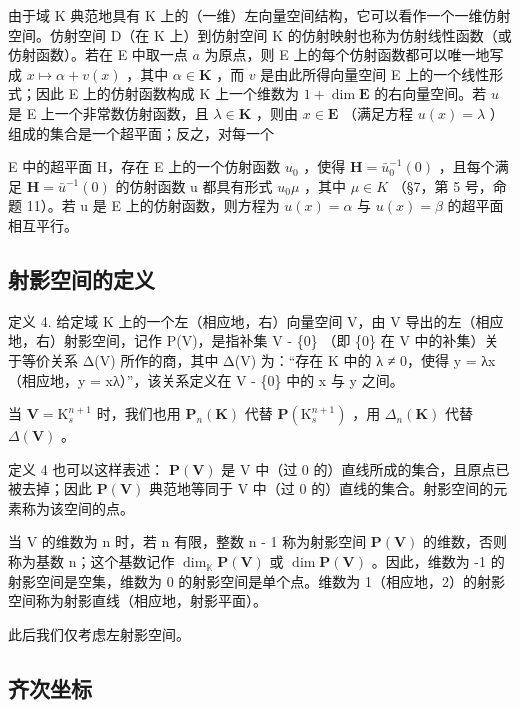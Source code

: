 由于域 K 典范地具有 K 上的（一维）左向量空间结构，它可以看作一个一维仿射空间。仿射空间 D（在 K 上）到仿射空间 K 的仿射映射也称为仿射线性函数（或仿射函数）。若在 E 中取一点 \(a\) 为原点，则 E 上的每个仿射函数都可以唯一地写成 \(x \mapsto \alpha + v(x)\) ，其中 \(\alpha \in \mathbf{K}\) ，而 \(v\) 是由此所得向量空间 E 上的一个线性形式；因此 E 上的仿射函数构成 K 上一个维数为 \(1 + \dim \mathbf{E}\) 的右向量空间。若 \(u\) 是 E 上一个非常数仿射函数，且 \(\lambda \in \mathbf{K}\) ，则由 \(x \in \mathbf{E}\) （满足方程 \(u(x) = \lambda\) ）组成的集合是一个超平面；反之，对每一个

E 中的超平面 H，存在 E 上的一个仿射函数 \(u_{0}\) ，使得 \(\mathbf{H} = \bar{u}_{0}^{-1}(0)\) ，且每个满足 \(\mathbf{H} = \bar{u}^{-1}(0)\) 的仿射函数 u 都具有形式 \(u_{0}\mu\) ，其中 \(\mu \in K\) （§7，第 5 号，命题 11）。若 u 是 E 上的仿射函数，则方程为 \(u(x) = \alpha\) 与 \(u(x) = \beta\) 的超平面相互平行。

\subsection{射影空间的定义}

定义 4. 给定域 K 上的一个左（相应地，右）向量空间 V，由 V 导出的左（相应地，右）射影空间，记作 P(V)，是指补集 V - \{0\} （即 \{0\} 在 V 中的补集）关于等价关系 Δ(V) 所作的商，其中 Δ(V) 为：“存在 K 中的 λ ≠ 0，使得 y = λx（相应地，y = xλ）”，该关系定义在 V - \{0\} 中的 x 与 y 之间。

当 \(\mathbf{V} = \mathrm{K}_s^{n + 1}\) 时，我们也用 \(\mathbf{P}_n(\mathbf{K})\) 代替 \(\mathbf{P}(\mathrm{K}_s^{n + 1})\) ，用 \(\Delta_n(\mathbf{K})\) 代替 \(\Delta (\mathbf{V})\) 。

定义 4 也可以这样表述： \(\mathbf{P}(\mathbf{V})\) 是 V 中（过 0 的）直线所成的集合，且原点已被去掉；因此 \(\mathbf{P}(\mathbf{V})\) 典范地等同于 V 中（过 0 的）直线的集合。射影空间的元素称为该空间的点。

当 V 的维数为 n 时，若 n 有限，整数 n - 1 称为射影空间 \(\mathbf{P}(\mathbf{V})\) 的维数，否则称为基数 n；这个基数记作 \(\dim_{\mathbb{K}} \mathbf{P}(\mathbf{V})\) 或 \(\dim \mathbf{P}(\mathbf{V})\) 。因此，维数为 -1 的射影空间是空集，维数为 0 的射影空间是单个点。维数为 1（相应地，2）的射影空间称为射影直线（相应地，射影平面）。

此后我们仅考虑左射影空间。

\subsection{齐次坐标}

